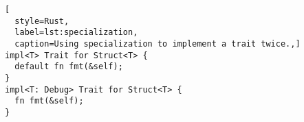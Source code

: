 \begin{lstlisting}[
  style=Rust,
  label=lst:specialization,
  caption=Using specialization to implement a trait twice.,]
impl<T> Trait for Struct<T> {
  default fn fmt(&self);
}
impl<T: Debug> Trait for Struct<T> {
  fn fmt(&self);
}
\end{lstlisting}
